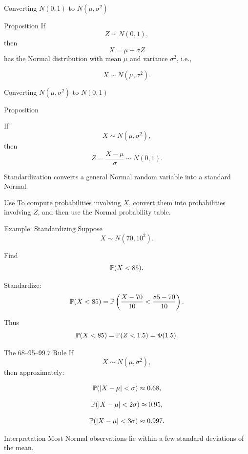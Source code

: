 \begin{frame}{Converting $N(0,1)$  to $N(\mu,\sigma^2)$ }
\begin{keybox}{Proposition}
If
\[
Z\sim N(0,1),
\]
then
\[
X=\mu+\sigma Z
\]
has the Normal distribution with mean $\mu$ and variance $\sigma^2$, i.e.,

\[
X\sim N(\mu,\sigma^2).
\]
\end{keybox}
\end{frame}

\begin{frame}{Converting $N(\mu,\sigma^2)$  to  $N(0,1)$  }


\begin{keybox}{Proposition}

If
\[
X\sim N(\mu,\sigma^2),
\]
then
\[
\boxed{
Z=\frac{X-\mu}{\sigma}\sim N(0,1).
}
\]
\end{keybox}
\vspace{0.25cm}

Standardization converts a general Normal random variable into a standard Normal.

\vspace{0.25cm}

\begin{keybox}{Use}
To compute probabilities involving $X$, convert them into probabilities involving $Z$, and then use the Normal probability table.
\end{keybox}
\end{frame}

\begin{frame}{Example: Standardizing}
Suppose
\[
X\sim N(70,10^2).
\]

Find
\[
\mathbb{P}(X<85).
\]

Standardize:
\[
\mathbb{P}(X<85)
=
\mathbb{P}\left(
\frac{X-70}{10}<\frac{85-70}{10}
\right).
\]

Thus
\[
\mathbb{P}(X<85)=\mathbb{P}(Z<1.5)=\Phi(1.5).
\]
\end{frame}

\begin{frame}{The 68--95--99.7 Rule}
If
\[
X\sim N(\mu,\sigma^2),
\]
then approximately:

\[
\mathbb{P}(|X-\mu|<\sigma)\approx 0.68,
\]

\[
\mathbb{P}(|X-\mu|<2\sigma)\approx 0.95,
\]

\[
\mathbb{P}(|X-\mu|<3\sigma)\approx 0.997.
\]

\vspace{0.25cm}

\begin{keybox}{Interpretation}
Most Normal observations lie within a few standard deviations of the mean.
\end{keybox}
\end{frame}










